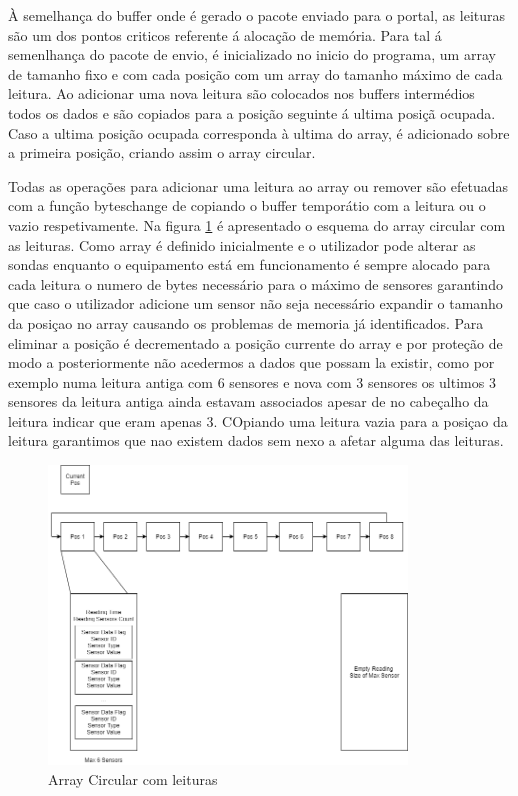 \par À semelhança do buffer onde é gerado o pacote enviado para o portal, as leituras são um dos pontos criticos referente á alocação de memória. Para tal á semenlhança do pacote de envio, é inicializado no inicio do programa, um array de tamanho fixo e com cada posição com um array do tamanho máximo de cada leitura. Ao adicionar uma nova leitura são colocados nos buffers intermédios todos os dados e são copiados para a posição seguinte á ultima posiçã ocupada. Caso a ultima posição ocupada corresponda à ultima do array, é adicionado sobre a primeira posição, criando assim o array circular.
\par Todas as operações para adicionar uma leitura ao array ou remover são efetuadas com a função byteschange de  copiando o buffer temporátio com a leitura ou o vazio respetivamente. Na figura \ref{circbuf} é apresentado o esquema do array circular com as leituras. Como array é definido inicialmente e o utilizador pode alterar as sondas enquanto o equipamento está em funcionamento é sempre alocado para cada leitura o numero de bytes necessário para o máximo de sensores garantindo que caso o utilizador adicione um sensor não seja necessário expandir o tamanho da posiçao no array causando os problemas de memoria já identificados. Para eliminar a posição é decrementado a posição currente do array e por proteção de modo a posteriormente não acedermos a dados que possam la existir, como por exemplo numa leitura antiga com 6 sensores e nova com 3 sensores os ultimos 3 sensores da leitura antiga ainda estavam associados apesar de no cabeçalho da leitura indicar que eram apenas 3. COpiando uma leitura vazia para a posiçao da leitura garantimos que nao existem dados sem nexo a afetar alguma das leituras.


 \begin{figure}[ht]
\centering
\includegraphics[width=0.85\textwidth]{images/circbuf.png}
\caption{Array Circular com leituras}\label{circbuf}
\end{figure}

